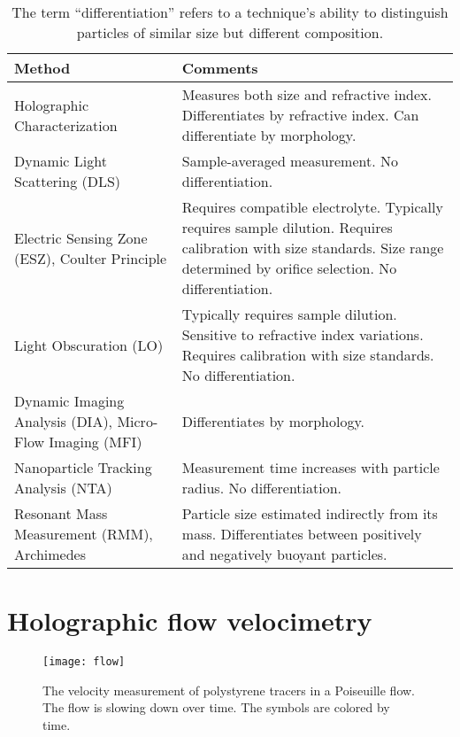 \setlength{\extrarowheight}{0.5em}
\begin{table}[!t]
  \centering
  \begin{tabular}{>{\raggedright}p{6cm} p{7.5cm}} \hline
    {\bf Method} & 
    {\bf Comments} \\\hline
    Holographic Characterization &
        Measures both size and refractive index. Differentiates by refractive index. Can differentiate by morphology. \\
    Dynamic Light Scattering (DLS) &
        Sample-averaged measurement. 
        No differentiation. \\
    Electric Sensing Zone (ESZ), 
    Coulter Principle  &
        Requires compatible electrolyte. 
        Typically requires sample dilution. 
        Requires calibration with size standards. 
        Size range determined by orifice selection. 
        No differentiation.\\
    Light Obscuration (LO)  & 
        Typically requires sample dilution. 
        Sensitive to refractive index variations. 
        Requires calibration with size standards.
        No differentiation.\\
    Dynamic Imaging Analysis (DIA), 
    Micro-Flow Imaging (MFI) &
        Differentiates by morphology. \\
    Nanoparticle Tracking Analysis (NTA) &
        Measurement time increases with particle radius. 
        No differentiation.\\
    Resonant Mass Measurement (RMM),
    Archimedes &
        Particle size estimated indirectly from its mass. 
        Differentiates between positively and negatively buoyant particles.\\
  \hline
  \end{tabular}
  \caption[Comparison of particle characterization techniques 2]{The term ``differentiation'' refers to a technique's ability to distinguish particles of similar size but different composition.}
  \label{tab:comments}
\end{table}

\newpage

\section{Holographic flow velocimetry}

\begin{figure}[t!]
  \centering
  \texttt{[image: flow]}
  \caption[Poiseuille flow profile]
  {The velocity measurement of polystyrene tracers in a Poiseuille flow. The flow 
  is slowing down over time. The symbols are colored by time.}
  \label{fig:flow}
\end{figure}

